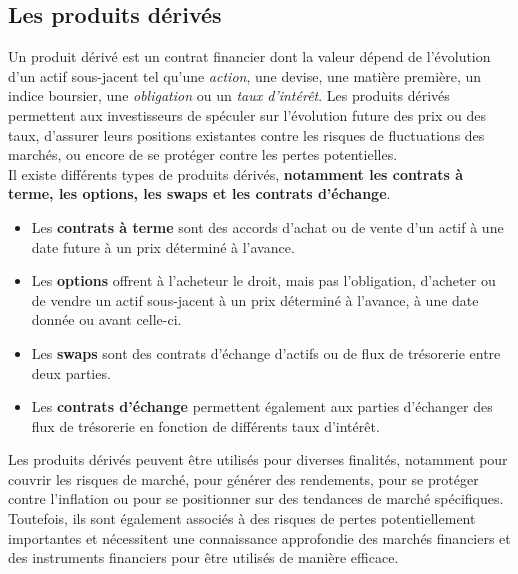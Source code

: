 \documentclass[a4paper]{article}
\begin{document}
\subsection{Les produits dérivés}
Un produit dérivé est un contrat financier dont la valeur dépend de l'évolution d'un actif sous-jacent tel qu'une \textit{action}, une devise, une matière première, un indice boursier, une \textit{obligation} ou un \textit{taux d'intérêt}. Les produits dérivés permettent aux investisseurs de spéculer sur l'évolution future des prix ou des taux, d'assurer leurs positions existantes contre les risques de fluctuations des marchés, ou encore de se protéger contre les pertes potentielles.
\vspace{2mm}
\\ Il existe différents types de produits dérivés, \textbf{notamment les contrats à terme, les options, les swaps et les contrats d'échange}.
\begin{itemize}
    \item Les \textbf{contrats à terme} sont des accords d'achat ou de vente d'un actif à une date future à un prix déterminé à l'avance.
    \item Les \textbf{options} offrent à l'acheteur le droit, mais pas l'obligation, d'acheter ou de vendre un actif sous-jacent à un prix déterminé à l'avance, à une date donnée ou avant celle-ci.
    \item Les \textbf{swaps} sont des contrats d'échange d'actifs ou de flux de trésorerie entre deux parties.
    \item Les \textbf{contrats d'échange} permettent également aux parties d'échanger des flux de trésorerie en fonction de différents taux d'intérêt.
\end{itemize}  
\vspace{2mm}
Les produits dérivés peuvent être utilisés pour diverses finalités, notamment pour couvrir les risques de marché, pour générer des rendements, pour se protéger contre l'inflation ou pour se positionner sur des tendances de marché spécifiques. Toutefois, ils sont également associés à des risques de pertes potentiellement importantes et nécessitent une connaissance approfondie des marchés financiers et des instruments financiers pour être utilisés de manière efficace.
\end{document}

